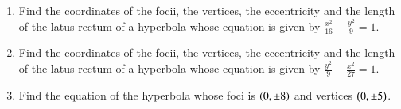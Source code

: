 \begin{enumerate}[label=\thesection.\arabic*,ref=\thesection.\theenumi]

	\item Find the coordinates of the focii, the vertices, the eccentricity and the length of the latus rectum of a hyperbola whose equation is given by $\frac{x^2}{16}-\frac{y^2}{9} = 1$. \\ 
		\solution
		
	\item Find the coordinates of the focii, the vertices, the eccentricity and the length of the latus rectum of a hyperbola whose equation is given by $\frac{y^2}{9}-\frac{x^2}{27}=1$.
		\solution
		\\
		
	\item Find the equation of the hyperbola whose foci is $\left(0,\pm 8\right)$ and vertices $\left(0,\pm 5\right)$.
\\
\solution
		

\end{enumerate}
